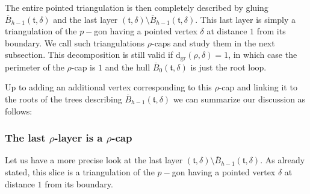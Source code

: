 \documentclass[AHL,XML,longabstracts,Unicode,NoSaveZebib]{cedram}
\begin{document}
The entire pointed triangulation is then completely described by gluing $\overline{B}_{h-1}( \mathfrak{t}, \delta)$ and the last layer $(\mathfrak{t},\delta) \setminus \overline{B}_{h-1}( \mathfrak{t}, \delta)$. This last layer is simply a triangulation of the $p-$gon having a pointed vertex $\delta$ at distance $1$ from its boundary. We call such triangulations $\rho$-caps and study them in the next subsection. This decomposition is still valid if $ \mathrm{d_{gr}}(\rho,\delta)=1$, in which case the perimeter of the $\rho$-cap is $1$ and the hull $\overline{B}_{0}( \mathfrak{t}, \delta)$ is just the root loop.

Up to adding an additional vertex corresponding to this $\rho$-cap and linking it to the roots of the trees describing $\overline{B}_{h-1}( \mathfrak{t}, \delta)$ we can summarize  our discussion as follows:

\begin{center}
\end{center}

\subsubsection{The last \texorpdfstring{$\rho$-}{rho-}layer is a \texorpdfstring{$\rho$-}{rho-}cap}
\label{sec:rhocap}

Let us have a more precise look at the last layer $(\mathfrak{t},\delta) \setminus \overline{B}_{h-1}( \mathfrak{t}, \delta)$. As already stated, this slice is a triangulation of the $p-$gon having a pointed vertex $\delta$ at distance $1$ from its boundary.
\end{document}
